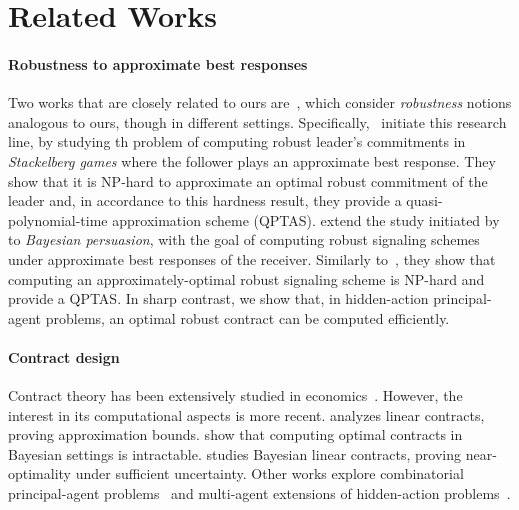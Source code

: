 \section{Related Works}
%
\paragraph{Robustness to approximate best responses} 
Two works that are closely related to ours are~\citep{gan2024robust,yang2024computational}, which consider \emph{robustness} notions analogous to ours, though in different settings.
%
Specifically,~\citet{gan2024robust} initiate this research line, by studying th problem of computing robust leader's commitments in \emph{Stackelberg games} where the follower plays an approximate best response.
%
%
They show that it is \textsf{NP}-hard to approximate an optimal robust commitment of the leader and, in accordance to this hardness result, they provide a quasi-polynomial-time approximation scheme (QPTAS).
%
\citet{yang2024computational} extend the study initiated by~\citet{gan2024robust} to \emph{Bayesian persuasion}, with the goal of computing robust signaling schemes under approximate best responses of the receiver.
%
Similarly to~\citet{gan2024robust}, they show that computing an approximately-optimal robust signaling scheme is \textsf{NP}-hard and provide a QPTAS.
%
In sharp contrast, we show that, in hidden-action principal-agent problems, an optimal robust contract can be computed efficiently.
%
\paragraph{Contract design} 
Contract theory has been extensively studied in economics~\cite{holmstrom1991multitask}. 
%
However, the interest in its computational aspects is more recent. 
%
\citep{dutting2019simple} analyzes linear contracts, proving approximation bounds. \citep{castiglioni2022bayesian,guruganesh2021contracts} show that computing optimal contracts in Bayesian settings is intractable. 
%
\citep{alon2023bayesian} studies Bayesian linear contracts, proving near-optimality under sufficient uncertainty. 
%
Other works explore combinatorial principal-agent problems~\citep{babaioff2006combinatorial,babaioff2009free} and multi-agent extensions of hidden-action problems~\citep{castiglioni2023multi,duetting2024multiagent}.


